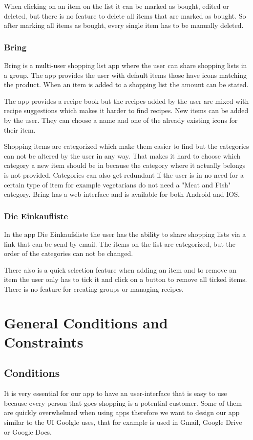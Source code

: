 \documentclass[12pt]{article}
\theoremstyle{definition}
\begin{document}
When clicking on an item on the list it can be marked as bought, edited or deleted, but there is no feature to delete all items that are marked as bought. So after marking all items as bought, every single item has to be manually deleted. 

\subsubsection{Bring}
Bring is a multi-user shopping list app where the user can share shopping lists in a group. The app provides the user with default items those have icons matching the product. When an item is added to a shopping list the amount can be stated. 

The app provides a recipe book but the recipes added by the user are mixed with recipe suggestions which makes it harder to find recipes. New items can be added by the user. They can choose a name and one of the already existing icons for their item.

Shopping items are categorized which make them easier to find but the categories can not be altered by the user in any way. That makes it hard to choose which category a new item should be in because the category where it actually belongs is not provided.
Categories can also get redundant if the user is in no need for a certain type of item for example vegetarians do not need a "Meat and Fish" category. Bring has a web-interface and is available for both Android and IOS.  

\subsubsection{Die Einkaufliste}
In the app Die Einkaufsliste the user has the ability to share shopping lists via a link that can be send by email. The items on the list are categorized, but the order of the categories can not be changed.

There also is a quick selection feature when adding an item and to remove an item the user only has to tick it and click on a button to remove all ticked items. There is no feature for creating groups or managing recipes.

\pagebreak

\section{General Conditions and Constraints}

\subsection{Conditions}
It is very essential for our app to have an user-interface that is easy to use because every person that goes shopping is a potential customer. Some of them are quickly overwhelmed when using apps therefore we want to design our app similar to the UI Goolgle uses, that for example  is used in Gmail, Google Drive or Google Docs.
\end{document}
